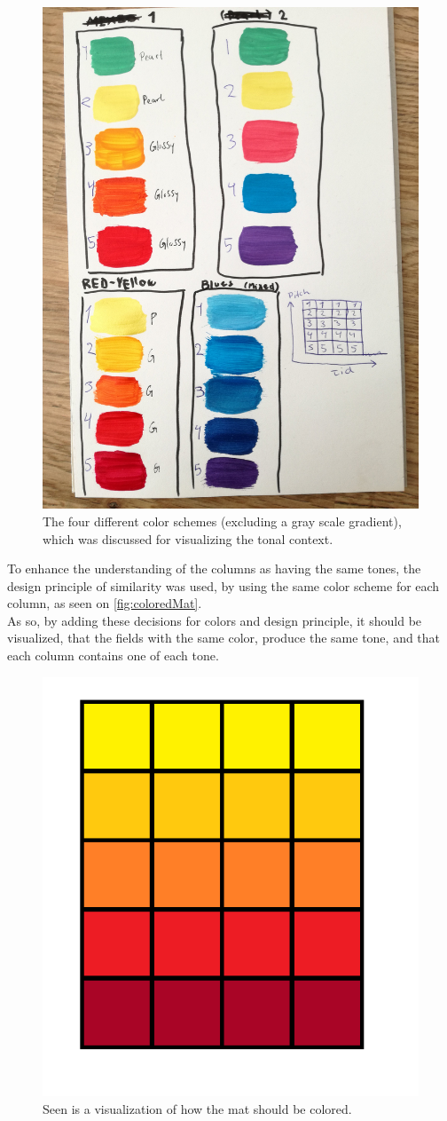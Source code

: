 \begin{figure}[H]
	\centering
	\includegraphics[width=0.5\linewidth]{figure/Design/colors}
	\caption{The four different color schemes (excluding a gray scale gradient), which was discussed for visualizing the tonal context.}	
	\label{fig:colors}
\end{figure}

To enhance the understanding of the columns as having the same tones, the design principle of similarity was used, by using the same color scheme for each column, as seen on \autoref{fig:coloredMat}. \\
As so, by adding these decisions for colors and design principle, it should be visualized, that the fields with the same color, produce the same tone, and that each column contains one of each tone.  

\begin{figure}[H]
	\centering
	\includegraphics[width=0.5\linewidth]{figure/Design/coloredMat}
	\caption{Seen is a visualization of how the mat should be colored.}	
	\label{fig:coloredMat}
 \end{figure}


